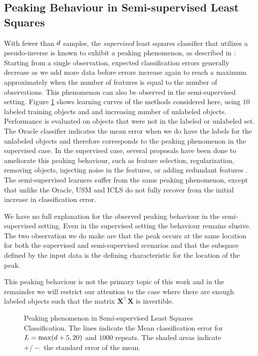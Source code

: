 \documentclass{elsarticle}
\begin{document}


\subsection{Peaking Behaviour in Semi-supervised Least Squares}
With fewer than $d$ samples, the \emph{supervised} least squares classifier that utilizes a pseudo-inverse is known to exhibit a peaking phenomenon, as described in \cite{Opper1996,Raudys1998}: Starting from a single observation, expected classification errors generally decrease as we add more data before errors increase again to reach a maximum approximately when the number of features is equal to the number of observations. This phenomenon can also be observed in the semi-supervised setting. Figure \ref{fig:peaking} shows learning curves of the methods considered here, using $10$ labeled training objects and and increasing number of unlabeled objects. Performance is evaluated on objects that were not in the labeled or unlabeled set. The Oracle classifier indicates the mean error when we do have the labels for the unlabeled objects and therefore corresponds to the peaking phenomenon in the supervised case. In the supervised case, several proposals have been done to ameliorate this peaking behaviour, such as feature selection, regularization, removing objects, injecting noise in the features, or adding redundant features \cite{Skurichina1999}. The semi-supervised learners suffer from the same peaking phenomenon, except that unlike the Oracle, USM and ICLS
do not fully recover from the initial increase in classification error.

We have no full explanation for the observed peaking behaviour in the semi-supervised setting. Even in the supervised setting the behaviour remains elusive. The two observation we do make are that the peak occurs at the same location for both the supervised and semi-supervised scenarios and that the subspace defined by the input data is the defining characteristic for the location of the peak.

This peaking behaviour is not the primary topic of this work and in the remainder we will restrict our attention to the case where there are enough labeled objects such that the matrix $\mathbf{X}^\top \mathbf{X}$ is invertible. 

\begin{figure}[t] 
  \centering
      \hspace*{-3.0cm}
      
  \caption{Peaking phenomenon in Semi-supervised Least Squares Classification. The lines indicate the Mean classification error for $L=\max(d+5,20)$ and $1000$ repeats. The shaded areas indicate $+/-$ the standard error of the mean.} \label{fig:peaking}
\end{figure}
\end{document}
